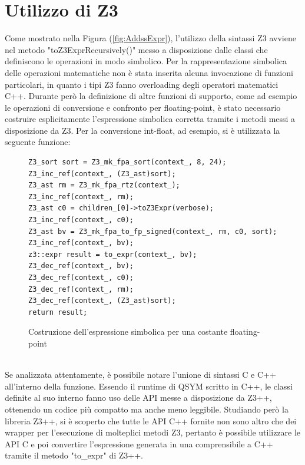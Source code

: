\documentclass[Lau, oneside]{sapthesis}%
\begin{document}
\section{Utilizzo di Z3}
Come mostrato nella Figura (\ref{fig:AddssExpr}), l'utilizzo della sintassi Z3 avviene nel metodo "toZ3ExprRecursively()" messo a disposizione dalle classi che definiscono le operazioni in modo simbolico.
\newline \newline
Per la rappresentazione simbolica delle operazioni matematiche non è stata inserita alcuna invocazione di funzioni particolari, in quanto i tipi Z3 fanno overloading degli operatori matematici C++.
\newline
Durante però la definizione di altre funzioni di supporto, come ad esempio le operazioni di conversione e confronto per floating-point, è stato necessario costruire esplicitamente l'espressione simbolica corretta tramite i metodi messi a disposizione da Z3.
\newline \newline
Per la conversione int-float, ad esempio, si è utilizzata la seguente funzione:
\newline
\begin{figure}[h]
\vspace{-4.0mm}
\begin{lstlisting}[xleftmargin=0\textwidth, language=SymQEMU, basicstyle=\small]
Z3_sort sort = Z3_mk_fpa_sort(context_, 8, 24); 
Z3_inc_ref(context_, (Z3_ast)sort);
Z3_ast rm = Z3_mk_fpa_rtz(context_);
Z3_inc_ref(context_, rm);
Z3_ast c0 = children_[0]->toZ3Expr(verbose);
Z3_inc_ref(context_, c0);
Z3_ast bv = Z3_mk_fpa_to_fp_signed(context_, rm, c0, sort);
Z3_inc_ref(context_, bv);
z3::expr result = to_expr(context_, bv);
Z3_dec_ref(context_, bv);
Z3_dec_ref(context_, c0);
Z3_dec_ref(context_, rm);
Z3_dec_ref(context_, (Z3_ast)sort);
return result;
\end{lstlisting}
    \caption{Costruzione dell'espressione simbolica per una costante floating-point}
    \label{fig:Cvtsi2ssExpr}
\end{figure}
\ \\
Se analizzata attentamente, è possibile notare l'unione di sintassi C e C++ all'interno della funzione.
\newline
Essendo il runtime di QSYM scritto in C++, le classi definite al suo interno fanno uso delle API messe a disposizione da Z3++, ottenendo un codice più compatto ma anche meno leggibile.
\newline
Studiando però la libreria Z3++, si è scoperto che tutte le API C++ fornite non sono altro che dei wrapper per l'esecuzione di molteplici metodi Z3, pertanto è possibile utilizzare le API C e poi convertire l'espressione generata in una comprensibile a C++ tramite il metodo "to\_expr" di Z3++.
\end{document}
